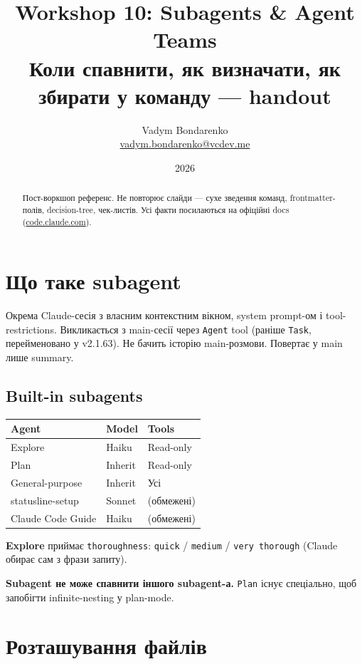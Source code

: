 \documentclass[11pt,a4paper]{article}
\title{%
  {\Huge\bfseries Workshop 10: Subagents \& Agent Teams}\\[0.6em]
  {\large Коли спавнити, як визначати, як збирати у команду --- handout}
}
\author{Vadym Bondarenko \\ \small\href{mailto:vadym.bondarenko@vcdev.me}{vadym.bondarenko@vcdev.me}}
\date{2026}
\begin{document}
\maketitle

\begin{abstract}
Пост-воркшоп референс. Не повторює слайди --- сухе зведення команд, frontmatter-полів, decision-tree, чек-листів. Усі факти посилаються на офіційні docs (\href{https://code.claude.com/docs/en/subagents}{code.claude.com}).
\end{abstract}

\tableofcontents
\newpage

\section{Що таке subagent}

Окрема Claude-сесія з власним контекстним вікном, system prompt-ом і tool-restrictions. Викликається з main-сесії через \texttt{Agent} tool (раніше \texttt{Task}, перейменовано у v2.1.63). Не бачить історію main-розмови. Повертає у main лише summary.

\subsection{Built-in subagents}

\begin{tabular}{lll}
\hline
\textbf{Agent} & \textbf{Model} & \textbf{Tools} \\
\hline
Explore & Haiku & Read-only \\
Plan & Inherit & Read-only \\
General-purpose & Inherit & Усі \\
statusline-setup & Sonnet & (обмежені) \\
Claude Code Guide & Haiku & (обмежені) \\
\hline
\end{tabular}

\textbf{Explore} приймає \texttt{thoroughness}: \texttt{quick} / \texttt{medium} / \texttt{very thorough} (Claude обирає сам з фрази запиту).

\textbf{Subagent не може спавнити іншого subagent-а.} \texttt{Plan} існує спеціально, щоб запобігти infinite-nesting у plan-mode.

\section{Розташування файлів}
\end{document}
